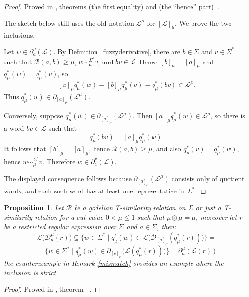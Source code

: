 \documentclass{article}
\newcommand{\cR}{{\mathcal R}}
\def\cut{\mu}
\newtheorem{proposition}{Proposition}[section]
\begin{document}
\begin{proof}
\begin{sloppypar}\raggedright
Proved in , theorems
 (the first equality) and
 (the ``hence'' part)~\cite{OurRocqRepo}.
\end{sloppypar}
{\color{red} The sketch below still uses the old notation $\mathcal L^\cut$ for $[\mathcal L]_\cut$.}
We prove the two inclusions.

Let $w\in\partial_a^\cut(\mathcal L)$. By Definition~\ref{fuzzyderivative},
there are $b\in\Sigma$ and $v\in\Sigma^*$ such that $\cR(a,b)\ge\cut$,
$w\sim_\cut^{\Sigma^*}v$, and $bv\in\mathcal L$. Hence
$[b]_\cut=[a]_\cut$ and $q_\cut^*(w)=q_\cut^*(v)$, so
\[
  [a]_\cut q_\cut^*(w)
  =
  [b]_\cut q_\cut^*(v)
  =
  q_\cut^*(bv)
  \in \mathcal L^\cut.
\]
Thus $q_\cut^*(w)\in\partial_{[a]_\cut}(\mathcal L^\cut)$.

Conversely, suppose $q_\cut^*(w)\in\partial_{[a]_\cut}(\mathcal L^\cut)$. Then
$[a]_\cut q_\cut^*(w)\in\mathcal L^\cut$, so there is a word $bv\in\mathcal L$
such that
\[
  q_\cut^*(bv)=[a]_\cut q_\cut^*(w).
\]
It follows that $[b]_\cut=[a]_\cut$, hence $\cR(a,b)\ge\cut$, and also
$q_\cut^*(v)=q_\cut^*(w)$, hence $w\sim_\cut^{\Sigma^*}v$. Therefore
$w\in\partial_a^\cut(\mathcal L)$.

The displayed consequence follows because
$\partial_{[a]_\cut}(\mathcal L^\cut)$ consists only of quotient words, and each
such word has at least one representative in $\Sigma^*$.
\end{proof}

\begin{proposition}\label{prop:quotient-syntactic-derivative}
Let $\cR$ be a g\"odelian T-similarity relation on $\Sigma$ or just a T-similarity relation for a cut value $0 < \cut \le 1$ such that $\mu\otimes\mu=\mu$, moreover let $r$ be a restricted regular expression over $\Sigma$ and $a\in\Sigma$, then:
\[
 \mathcal L\bigl(\mathcal D_a^\cut( r)\bigr)
  \subseteq
 \{w\in \Sigma^* \mid q_\cut^*(w)\in \mathcal L\bigl(\mathcal D_{[a]_\cut}(q_\cut^*(r))\bigr)\}= \]
\[=\{w\in \Sigma^* \mid q_\cut^*(w)\in \partial_{[a]_\cut}\bigl(\mathcal L(q_\cut^*(r))\bigr)\}= \partial_a^\cut(\mathcal L(r))\]
the counterexample in Remark~\ref{mismatch} provides an example where the inclusion is strict.
\end{proposition}
\begin{proof}
\begin{sloppypar}\raggedright
Proved in , theorem
~\cite{OurRocqRepo}.
\end{sloppypar}
\end{proof}
\vspace{1cm}
\end{document}
